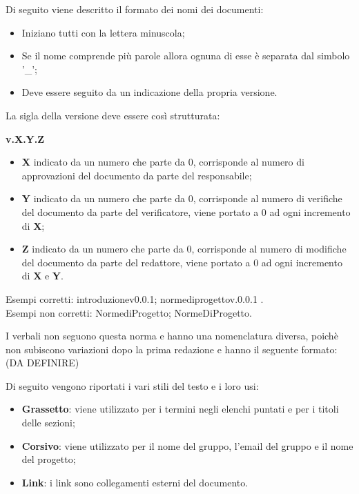 Di seguito viene descritto il formato dei nomi dei documenti:
\begin{itemize}
\item Iniziano tutti con la lettera minuscola;
\item Se il nome comprende più parole allora ognuna di esse è separata dal simbolo '\_';
\item Deve essere seguito da un indicazione della propria versione.
\end {itemize}
La sigla della versione deve essere così strutturata:
\begin{center}
    \large{\textbf{v.X.Y.Z}}
\end{center}
\begin{itemize}
\item \textbf{X} indicato da un numero che parte da 0, corrisponde al numero di approvazioni del documento da parte del responsabile;
\item \textbf{Y} indicato da un numero che parte da 0, corrisponde al numero di verifiche del documento da parte del verificatore, viene portato a 0 ad ogni incremento di \textbf{X};
\item \textbf{Z} indicato da un numero che parte da 0, corrisponde al numero di modifiche del documento da parte del redattore, viene portato a 0 ad ogni incremento di \textbf{X} e \textbf{Y}.
\end {itemize}
Esempi corretti: introduzione\textunderscore v0.0.1; norme\textunderscore di\textunderscore progetto\textunderscore v.0.0.1 .\\
Esempi non corretti: Norme\textunderscore di\textunderscore Progetto; NormeDiProgetto.

I verbali non seguono questa norma e hanno una nomenclatura diversa, poichè non subiscono variazioni dopo la prima redazione e hanno il seguente formato: (DA DEFINIRE)

Di seguito vengono riportati i vari stili del testo e i loro usi:
\begin {itemize}
\item \textbf{Grassetto}: viene utilizzato per i termini negli elenchi puntati e per i titoli delle sezioni;
\item \textbf{Corsivo}: viene utilizzato per il nome del gruppo, l'email del gruppo e il nome del progetto;
\item \textbf{Link}: i link sono collegamenti esterni del documento.
\end {itemize}

